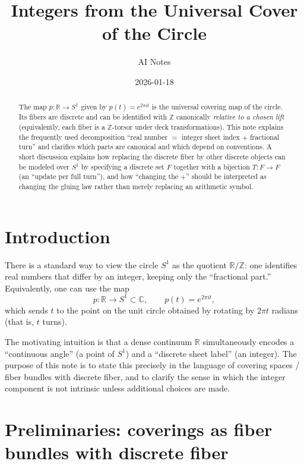 \documentclass[11pt,a4paper]{article}
\title{Integers from the Universal Cover of the Circle}
\author{AI Notes}
\date{2026-01-18}
\theoremstyle{definition}
\theoremstyle{remark}
\begin{document}
\maketitle

\begin{abstract}
The map \(p:\mathbb{R}\to S^{1}\) given by \(p(t)=e^{2\pi i t}\) is the universal covering map of the circle. Its fibers are discrete and can be identified with \(\mathbb{Z}\) canonically \emph{relative to a chosen lift} (equivalently, each fiber is a \(\mathbb{Z}\)-torsor under deck transformations). This note explains the frequently used decomposition ``real number \(=\) integer sheet index \(+\) fractional turn'' and clarifies which parts are canonical and which depend on conventions. A short discussion explains how replacing the discrete fiber by other discrete objects can be modeled over \(S^{1}\) by specifying a discrete set \(F\) together with a bijection \(T:F\to F\) (an ``update per full turn''), and how ``changing the \(+\)'' should be interpreted as changing the gluing law rather than merely replacing an arithmetic symbol.
\end{abstract}

\section{Introduction}
\label{sec:introduction}

There is a standard way to view the circle \(S^{1}\) as the quotient \(\mathbb{R}/\mathbb{Z}\): one identifies real numbers that differ by an integer, keeping only the ``fractional part.'' Equivalently, one can use the map
\begin{equation}
\label{eq:covering-map}
p:\mathbb{R}\longrightarrow S^{1}\subset \mathbb{C},
\qquad
p(t)=e^{2\pi i t},
\end{equation}
which sends \(t\) to the point on the unit circle obtained by rotating by \(2\pi t\) radians (that is, \(t\) turns).

The motivating intuition is that a dense continuum \(\mathbb{R}\) simultaneously encodes a ``continuous angle'' (a point of \(S^{1}\)) and a ``discrete sheet label'' (an integer). The purpose of this note is to state this precisely in the language of covering spaces / fiber bundles with discrete fiber, and to clarify the sense in which the integer component is not intrinsic unless additional choices are made.

\section{Preliminaries: coverings as fiber bundles with discrete fiber}
\label{sec:preliminaries}
\end{document}

